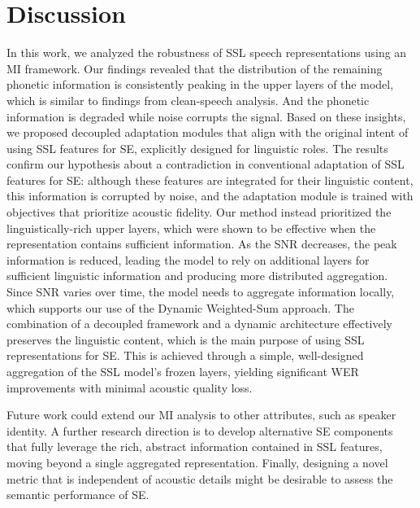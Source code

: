 \documentclass{article}
\begin{document}
\section{Discussion}
\label{sec:conclusion}
In this work, we analyzed the robustness of SSL speech representations using an MI framework. Our findings revealed that the distribution of the remaining phonetic information is consistently peaking in the upper layers of the model, which is similar to findings from clean-speech analysis.
And the phonetic information is degraded while noise corrupts the signal.
Based on these insights, we proposed decoupled adaptation modules that align with the original intent of using SSL features for SE, explicitly designed for linguistic roles.
The results confirm our hypothesis about a contradiction in conventional adaptation of SSL features for SE: although these features are integrated for their linguistic content, this information is corrupted by noise, and the adaptation module is trained with objectives that prioritize acoustic fidelity.
Our method instead prioritized the linguistically-rich upper layers, which were shown to be effective when the representation contains sufficient information.
As the SNR decreases, the peak information is reduced, leading the model to rely on additional layers for sufficient linguistic information and producing more distributed aggregation. Since SNR varies over time, the model needs to aggregate information locally, which supports our use of the Dynamic Weighted-Sum approach.
The combination of a decoupled framework and a dynamic architecture effectively preserves the linguistic content, which is the main purpose of using SSL representations for SE. This is achieved through a simple, well-designed aggregation of the SSL model's frozen layers, yielding significant WER improvements with minimal acoustic quality loss.

Future work could extend our MI analysis to other attributes, such as speaker identity. A further research direction is to develop alternative SE components that fully leverage the rich, abstract information contained in SSL features, moving beyond a single aggregated representation. Finally, designing a novel metric that is independent of acoustic details might be desirable to assess the semantic performance of SE.
\end{document}
